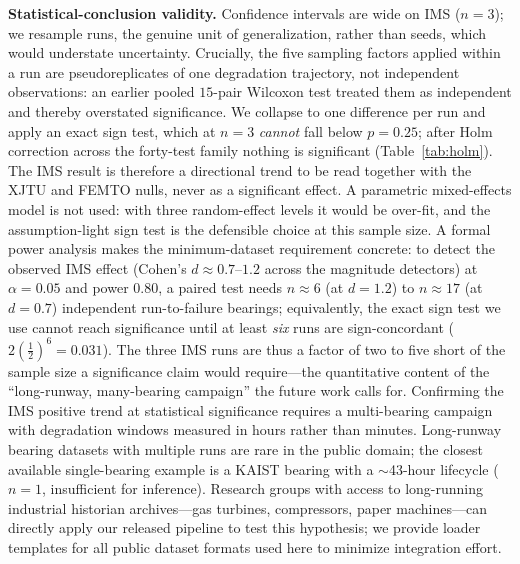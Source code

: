 \documentclass[journal]{IEEEtran}
\begin{document}
\textbf{Statistical-conclusion validity.} Confidence intervals are wide on IMS
($n{=}3$); we resample runs, the genuine unit of generalization, rather than
seeds, which would understate uncertainty. Crucially, the five sampling factors
applied within a run are pseudoreplicates of one degradation trajectory, not
independent observations: an earlier pooled $15$-pair Wilcoxon test treated them
as independent and thereby overstated significance. We collapse to one
difference per run and apply an exact sign test, which at $n{=}3$ \emph{cannot}
fall below $p{=}0.25$; after Holm correction across the forty-test family
nothing is significant (Table~\ref{tab:holm}). The IMS result is therefore a
directional trend to be read together with the XJTU and FEMTO nulls, never as a
significant effect. A
parametric mixed-effects model is not used: with three random-effect levels it
would be over-fit, and the assumption-light sign test is the defensible choice
at this sample size. A formal power analysis makes the minimum-dataset requirement
concrete: to detect the observed IMS effect (Cohen's $d\approx0.7$--$1.2$ across the
magnitude detectors) at $\alpha{=}0.05$ and power $0.80$, a paired test needs
$n\approx6$ (at $d{=}1.2$) to $n\approx17$ (at $d{=}0.7$) independent run-to-failure
bearings; equivalently, the exact sign test we use cannot reach significance until at
least \emph{six} runs are sign-concordant ($2(\tfrac12)^6{=}0.031$). The three IMS runs
are thus a factor of two to five short of the sample size a significance claim would
require---the quantitative content of the ``long-runway, many-bearing campaign'' the
future work calls for. Confirming the IMS positive trend at statistical significance
requires a multi-bearing campaign with degradation windows measured in hours rather
than minutes. Long-runway bearing datasets with multiple runs are rare in the public
domain; the closest available single-bearing example is a KAIST bearing with a
$\sim$43-hour lifecycle ($n{=}1$, insufficient for inference). Research groups with
access to long-running industrial historian archives---gas turbines, compressors,
paper machines---can directly apply our released pipeline to test this hypothesis; we
provide loader templates for all public dataset formats used here to minimize
integration effort.
\end{document}

